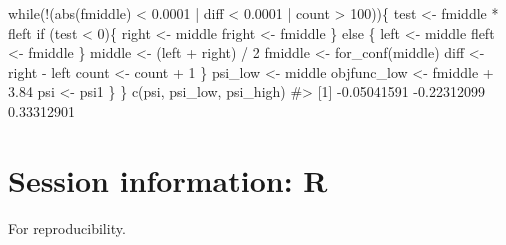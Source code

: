 \documentclass[
  10pt,
  a4paper,
]{book}
\newenvironment{Shaded}{\begin{snugshade}}{\end{snugshade}}
\newcommand{\CommentTok}[1]{\textcolor[rgb]{0.37,0.37,0.37}{#1}}
\newcommand{\ControlFlowTok}[1]{\textcolor[rgb]{0.00,0.46,0.62}{#1}}
\newcommand{\DecValTok}[1]{\textcolor[rgb]{0.68,0.00,0.00}{#1}}
\newcommand{\FloatTok}[1]{\textcolor[rgb]{0.68,0.00,0.00}{#1}}
\newcommand{\FunctionTok}[1]{\textcolor[rgb]{0.28,0.35,0.67}{#1}}
\newcommand{\NormalTok}[1]{\textcolor[rgb]{0.00,0.46,0.62}{#1}}
\newcommand{\OtherTok}[1]{\textcolor[rgb]{0.00,0.46,0.62}{#1}}
\newcommand{\SpecialCharTok}[1]{\textcolor[rgb]{0.37,0.37,0.37}{#1}}
\begin{document}
\begin{Shaded}
\begin{Highlighting}[]
    \ControlFlowTok{while}\NormalTok{(}\SpecialCharTok{!}\NormalTok{(}\FunctionTok{abs}\NormalTok{(fmiddle) }\SpecialCharTok{\textless{}} \FloatTok{0.0001} \SpecialCharTok{|}\NormalTok{ diff }\SpecialCharTok{\textless{}} \FloatTok{0.0001} \SpecialCharTok{|}\NormalTok{ count }\SpecialCharTok{\textgreater{}} \DecValTok{100}\NormalTok{))\{}
\NormalTok{      test }\OtherTok{\textless{}{-}}\NormalTok{ fmiddle }\SpecialCharTok{*}\NormalTok{ fleft}
      \ControlFlowTok{if}\NormalTok{ (test }\SpecialCharTok{\textless{}} \DecValTok{0}\NormalTok{)\{}
\NormalTok{        right }\OtherTok{\textless{}{-}}\NormalTok{ middle}
\NormalTok{        fright }\OtherTok{\textless{}{-}}\NormalTok{ fmiddle}
\NormalTok{      \} }\ControlFlowTok{else}\NormalTok{ \{}
\NormalTok{        left }\OtherTok{\textless{}{-}}\NormalTok{ middle}
\NormalTok{        fleft }\OtherTok{\textless{}{-}}\NormalTok{ fmiddle}
\NormalTok{      \}}
\NormalTok{      middle }\OtherTok{\textless{}{-}}\NormalTok{ (left }\SpecialCharTok{+}\NormalTok{ right) }\SpecialCharTok{/} \DecValTok{2}
\NormalTok{      fmiddle }\OtherTok{\textless{}{-}} \FunctionTok{for\_conf}\NormalTok{(middle)}
\NormalTok{      diff }\OtherTok{\textless{}{-}}\NormalTok{ right }\SpecialCharTok{{-}}\NormalTok{ left}
\NormalTok{      count }\OtherTok{\textless{}{-}}\NormalTok{ count }\SpecialCharTok{+} \DecValTok{1}
\NormalTok{    \}}
\NormalTok{    psi\_low }\OtherTok{\textless{}{-}}\NormalTok{ middle}
\NormalTok{    objfunc\_low }\OtherTok{\textless{}{-}}\NormalTok{ fmiddle }\SpecialCharTok{+} \FloatTok{3.84}
\NormalTok{    psi }\OtherTok{\textless{}{-}}\NormalTok{ psi1}
\NormalTok{  \}}
\NormalTok{\}}
\FunctionTok{c}\NormalTok{(psi, psi\_low, psi\_high)}
\CommentTok{\#\textgreater{} [1] {-}0.05041591 {-}0.22312099  0.33312901}
\end{Highlighting}
\end{Shaded}

\chapter*{Session information: R}\label{session-information-r}

For reproducibility.
\end{document}
